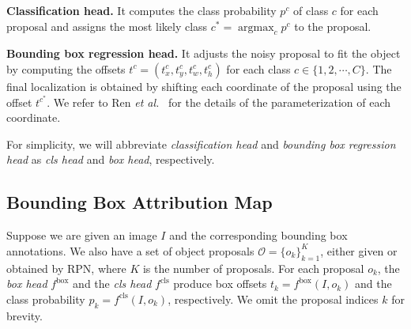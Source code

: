 \documentclass[final]{cvpr}
\newcommand{\argmax}{\mathop{\mathrm{argmax}}}
\begin{document}
\textbf{Classification head.} It computes the class probability $p^c$ of class $c$ for each proposal and assigns the most likely class $c^{*} = \argmax_{c} p^c$ to the proposal.

\textbf{Bounding box regression head.} It adjusts the noisy proposal to fit the object by computing the offsets $t^c = (t^c_x, t^c_y, t^c_w, t^c_h)$ for each class $c \in \{1, 2, \cdots, C\}$.
The final localization is obtained by shifting each coordinate of the proposal using the offset $t^{c^{*}}$.
We refer to Ren \textit{et al.}~\cite{ren2015faster} for the details of the parameterization of each coordinate. 

For simplicity, we will abbreviate \textit{classification head} and \textit{bounding box regression head} as \textit{cls head} and \textit{box head}, respectively.



\subsection{Bounding Box Attribution Map}\label{method_BBAM}
Suppose we are given an image $I$ and the corresponding bounding box annotations.
We also have a set of object proposals $\mathcal{O} = \{o_k\}^{K}_{k=1}$, either given or obtained by RPN, where $K$ is the number of proposals. For each proposal $o_k$, the \textit{box head} $f^{\text{box}}$ and the \textit{cls head} $f^{\text{cls}}$ produce box offsets $t_k = f^{\text{box}}(I, o_k)$ and the class probability $p_k = f^{\text{cls}}(I, o_k)$, respectively. We omit the proposal indices $k$ for brevity.
\end{document}
